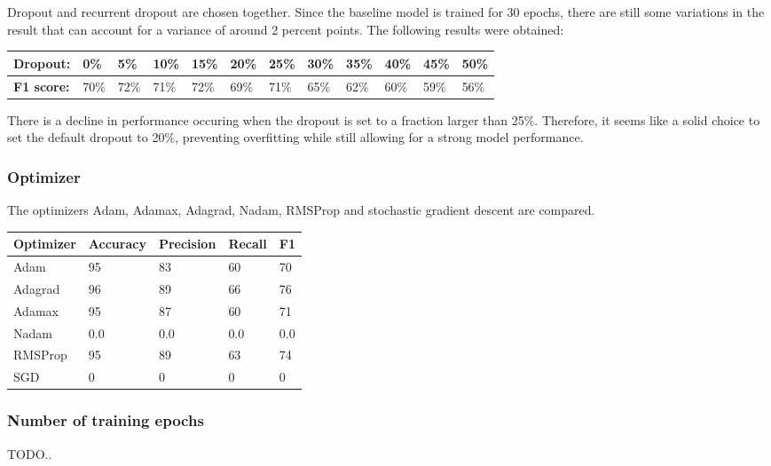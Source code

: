 \documentclass[
	a4paper,
	pagesize,
	pdftex,
	12pt,
	twoside, %
	BCOR=5mm, %
	ngerman,
	fleqn,
	final,
	]{scrartcl}
\begin{document}
Dropout and recurrent dropout are chosen together. Since the baseline model is trained for 30 epochs, there are still some variations in the result that can account for a variance of around 2 percent points. The following results were obtained:

\begin{tabular} { | p{2cm} || p{0.8cm} | p{0.8cm} | p{0.8cm} | p{0.8cm}  | p{0.8cm} | p{0.8cm} | p{0.8cm} | p{0.8cm} | p{0.8cm} | p{0.8cm} | p{0.8cm} |}
\hline
\textbf{Dropout:}  & 0\% & 5\% & 10\% & 15\%   & 20\% & 25\% & 30\%   & 35\% & 40\% & 45\% & 50\% \\   
\hline
\textbf{F1 score:} & 70\% & 72\% & 71\% & 72\% & 69\% & 71\% & 65\% & 62\% & 60\% & 59\% & 56\% \\
\hline
\hline
\end{tabular}

There is a decline in performance occuring when the dropout is set to a fraction larger than 25\%. Therefore, it seems like a solid choice to set the default dropout to 20\%, preventing overfitting while still allowing for a strong model performance.



\subsubsection{Optimizer}

The optimizers Adam, Adamax, Adagrad, Nadam, RMSProp and stochastic gradient descent are compared. 

\begin{tabular}{ | p{2cm} || p{2cm}|p{2cm}|p{2cm}|p{2cm}|  }
	\hline
	Optimizer & Accuracy & Precision & Recall & F1 \\
	\hline
	Adam & 95 &  83 &  60 &  70 \\
	Adagrad & 96 &  89 &  66 &  76 \\
	Adamax & 95 &  87 &  60 &  71 \\
	Nadam & 0.0 &  0.0 &  0.0 &  0.0 \\
	RMSProp & 95 &  89 &  63 &  74 \\
	SGD & 0 &  0 &  0 & 0 \\
	\hline
	\hline
\end{tabular}


\subsubsection{Number of training epochs}

TODO..
\end{document}
